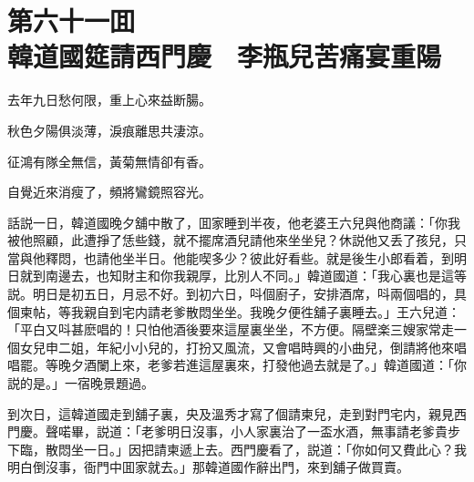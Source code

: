 
\chapter*{第六十一囬　\\韓道國筵請西門慶　李瓶兒苦痛宴重陽}


\begin{myquote}
去年九日愁何限，重上心來益断腸。

秋色夕陽俱淡薄，淚痕離思共淒涼。

征鴻有隊全無信，黃菊無情卻有香。

自覺近來消瘦了，頻將鸞鏡照容光。
\end{myquote}

話説一日，韓道國晚夕舖中散了，囬家睡到半夜，他老婆王六兒與他商議：「你我被他照顧，此遭掙了恁些錢，就不擺席酒兒請他來坐坐兒？休説他又丢了孩兒，只當與他釋悶，也請他坐半日。他能喫多少？彼此好看些。就是後生小郎看着，到明日就到南邊去，也知財主和你我親厚，比別人不同。」韓道國道：「我心裏也是這等説。明日是初五日，月忌不好。到初六日，呌個廚子，安排酒席，呌兩個唱的，具個柬帖，等我親自到宅内請老爹散悶坐坐。我晚夕便徃舖子裏睡去。」王六兒道：「平白又呌甚麽唱的！只怕他酒後要來這屋裏坐坐，不方便。隔壁楽三嫂家常走一個女兒申二姐，年紀小小兒的，打扮又風流，又會唱時興的小曲兒，倒請將他來唱唱罷。等晚夕酒闌上來，老爹若進這屋裏來，打發他過去就是了。」韓道國道：「你説的是。」一宿晚景題過。

到次日，這韓道國走到舖子裏，央及溫秀才寫了個請柬兒，走到對門宅内，親見西門慶。聲喏畢，説道：「老爹明日沒事，小人家裏治了一盃水酒，無事請老爹貴步下臨，散悶坐一日。」因把請柬遞上去。西門慶看了，説道：「你如何又費此心？我明白倒沒事，衙門中囬家就去。」那韓道國作辭出門，來到舖子做買賣。

